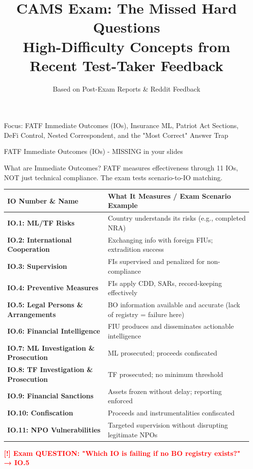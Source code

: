 \documentclass[11pt,a4paper]{beamer}
\title[CAMS Domain A - Missed Hard Questions]{CAMS Exam: The Missed Hard Questions\\High-Difficulty Concepts from Recent Test-Taker Feedback}
\author{Based on Post-Exam Reports \& Reddit Feedback}
\date{}
\newcommand{\redflag}[1]{\textcolor{red}{\textbf{[!] #1}}}
\begin{document}
\begin{frame}
\titlepage
\centering
\tiny Focus: FATF Immediate Outcomes (IOs), Insurance ML, Patriot Act Sections, DeFi Control, Nested Correspondent, and the "Most Correct" Answer Trap
\end{frame}


\begin{frame}{FATF Immediate Outcomes (IOs) - MISSING in your slides}
\begin{block}{What are Immediate Outcomes?}
FATF measures effectiveness through 11 IOs, NOT just technical compliance. The exam tests scenario-to-IO matching.
\end{block}
\begin{tabular}{p{}|p{}}
\hline
\rowcolor{lightgray}
\textbf{IO Number \& Name} & \textbf{What It Measures / Exam Scenario Example} \\
\hline
\textbf{IO.1: ML/TF Risks} & Country understands its risks (e.g., completed NRA) \\
\hline
\textbf{IO.2: International Cooperation} & Exchanging info with foreign FIUs; extradition success \\
\hline
\textbf{IO.3: Supervision} & FIs supervised and penalized for non-compliance \\
\hline
\textbf{IO.4: Preventive Measures} & FIs apply CDD, SARs, record-keeping effectively \\
\hline
\textbf{IO.5: Legal Persons \& Arrangements} & BO information available and accurate (lack of registry = failure here) \\
\hline
\textbf{IO.6: Financial Intelligence} & FIU produces and disseminates actionable intelligence \\
\hline
\textbf{IO.7: ML Investigation \& Prosecution} & ML prosecuted; proceeds confiscated \\
\hline
\textbf{IO.8: TF Investigation \& Prosecution} & TF prosecuted; no minimum threshold \\
\hline
\textbf{IO.9: Financial Sanctions} & Assets frozen without delay; reporting enforced \\
\hline
\textbf{IO.10: Confiscation} & Proceeds and instrumentalities confiscated \\
\hline
\textbf{IO.11: NPO Vulnerabilities} & Targeted supervision without disrupting legitimate NPOs \\
\hline
\end{tabular}
\redflag{Exam QUESTION: "Which IO is failing if no BO registry exists?" → IO.5}
\end{frame}
\end{document}
